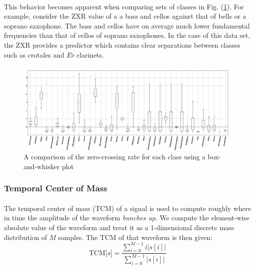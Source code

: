 \documentclass[12pt,letterpaper]{article}
\begin{document}
\paragraph*{}This behavior becomes apparent when comparing sets of classes in Fig. (\ref{fig-FeatureZXR}). For example, consider the ZXR value of a a bass and cellos against that of bells or a soprano saxophone. The bass and cellos have on average much lower fundamental frequencies than that of cellos of soprano saxophones. In the case of this data set, the ZXR provides a predictor which contains clear separations between classes such as crotales and $E\flat$ clarinets. 
\begin{figure}[H]
\begin{center}
\includegraphics[scale=0.3]{../FiguresFeatures/ZXR}
\end{center}
\caption{A comparison of the zero-crossing rate for each class using a box-and-whisker plot}
\label{fig-FeatureZXR}
\end{figure}


\subsubsection{Temporal Center of Mass}

\paragraph*{}The temporal center of mass (TCM) of a signal is used to compute roughly where in time the amplitude of the waveform \textit{bunches up}. We compute the element-wise absolute value of the waveform and treat it as a 1-dimensional discrete mass distribution of $M$ samples.
The TCM of that waveform is then given:
\begin{equation}
\label{eqn-FeatureTCM}
\text{TCM}\big[ s \big] = \frac{\sum_{i=0}^{M-1}i \big|s[i]\big|}
{\sum_{i=0}^{M-1}\big|s[i]\big|}
\end{equation}
\end{document}
